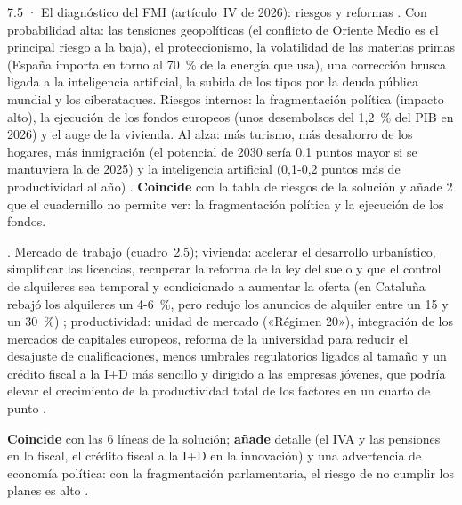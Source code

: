 \begin{complemento}{7.5 · El diagnóstico del FMI (artículo~IV de 2026): riesgos y reformas}
 . Con probabilidad alta: las tensiones geopolíticas (el conflicto de Oriente Medio es el principal riesgo a la baja), el proteccionismo, la volatilidad de las materias primas (España importa en torno al 70~\% de la energía que usa), una corrección brusca ligada a la inteligencia artificial, la subida de los tipos por la deuda pública mundial y los ciberataques. Riesgos internos: la fragmentación política (impacto alto), la ejecución de los fondos europeos (unos desembolsos del 1,2~\% del PIB en 2026) y el auge de la vivienda. Al alza: más turismo, más desahorro de los hogares, más inmigración (el potencial de 2030 sería 0,1 puntos mayor si se mantuviera la de 2025) y la inteligencia artificial (0,1-0,2 puntos más de productividad al año) . \textbf{Coincide} con la tabla de riesgos de la solución y añade 2 que el cuadernillo no permite ver: la fragmentación política y la ejecución de los fondos.

 . Mercado de trabajo (cuadro~2.5); vivienda: acelerar el desarrollo urbanístico, simplificar las licencias, recuperar la reforma de la ley del suelo y que el control de alquileres sea temporal y condicionado a aumentar la oferta (en Cataluña rebajó los alquileres un 4-6~\%, pero redujo los anuncios de alquiler entre un 15 y un 30~\%) ; productividad: unidad de mercado («Régimen 20»), integración de los mercados de capitales europeos, reforma de la universidad para reducir el desajuste de cualificaciones, menos umbrales regulatorios ligados al tamaño y un crédito fiscal a la I+D más sencillo y dirigido a las empresas jóvenes, que podría elevar el crecimiento de la productividad total de los factores en un cuarto de punto .

\textbf{Coincide} con las 6 líneas de la solución; \textbf{añade} detalle (el IVA y las pensiones en lo fiscal, el crédito fiscal a la I+D en la innovación) y una advertencia de economía política: con la fragmentación parlamentaria, el riesgo de no cumplir los planes es alto .
\end{complemento}

